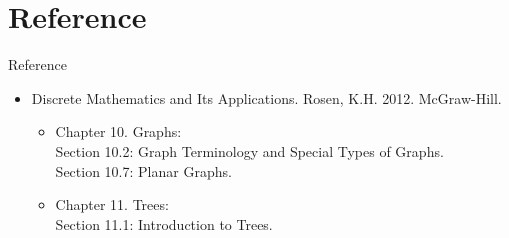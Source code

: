 \documentclass{beamer}
\theoremstyle{definition}
\begin{document}
\section*{Reference}

\begin{frame}{Reference}
    \begin{itemize}
        \item Discrete Mathematics and Its Applications. Rosen, K.H. 2012. McGraw-Hill. \\
        \begin{itemize}
         \item Chapter 10. Graphs: \\
            Section 10.2: Graph Terminology and Special Types of Graphs. \\
            Section 10.7: Planar Graphs. 
        \end{itemize}
        \begin{itemize}
         \item Chapter 11. Trees: \\
            Section 11.1: Introduction to Trees.
        \end{itemize}
    \end{itemize}
\end{frame}
\end{document}
